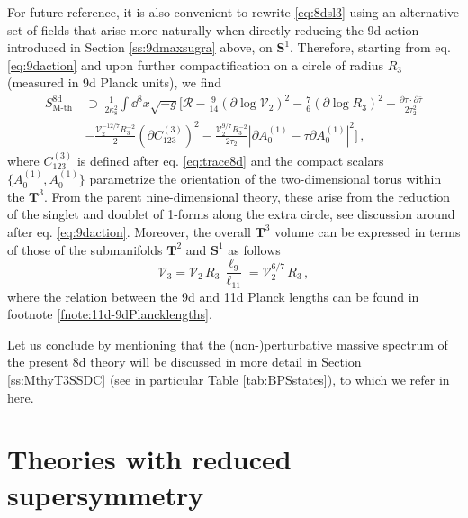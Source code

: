 For future reference, it is also convenient to rewrite \eqref{eq:8dsl3} using an alternative set of fields that arise more naturally when directly reducing the 9d action introduced in Section \ref{ss:9dmaxsugra} above, on $\mathbf{S}^1$. Therefore, starting from eq. \eqref{eq:9daction} and upon further compactification on a circle of radius $R_3$ (measured in 9d Planck units), we find
%
\begin{equation}\label{eq:8dalternativeaction}
\begin{aligned}
	S_\text{M-th}^{\text{8d}}\, &\supset\, \frac{1}{2\kappa_{8}^2} \int \dd^{8}x\sqrt{-g} \Bigg[\mathcal{R}-\frac{9}{14} \left( \partial \log \mathcal{V}_2\right)^2 - \frac{7}{6} \left( \partial \log R_3\right)^2 -\frac{\partial \tau \cdot \partial \bar \tau}{2 \tau_2^2}\\
      &- \frac{\mathcal{V}_2^{-12/7} R_3^{-2}}{2} \left( \partial C_{123}^{(3)}\right)^2 -\frac{\mathcal{V}_2^{9/7} R_3^{-2}}{2 \tau_2} \left| \partial A^{(1)}_0-\tau \partial A^{(1)}_0 \right|^2\Bigg]\, ,
\end{aligned}
\end{equation}
%
where $C_{123}^{(3)}$ is defined after eq. \eqref{eq:trace8d} and the compact scalars $\{ A^{(1)}_0, A^{(1)}_0 \}$ parametrize the orientation of the two-dimensional torus within the $\mathbf{T}^3$. From the parent nine-dimensional theory, these arise from the reduction of the singlet and doublet of 1-forms along the extra circle, see discussion around after eq. \eqref{eq:9daction}. Moreover, the overall $\mathbf{T}^3$ volume can be expressed in terms of those of the submanifolds $\mathbf{T}^2$ and $\mathbf{S}^1$ as follows
%
\begin{equation} \label{eq:T3volume}
     \mathcal{V}_3 = \mathcal{V}_2\, R_3\, \frac{\ell_9}{\ell_{11}} = \mathcal{V}_2^{6/7}\, R_3\, ,
\end{equation}
%
where the relation between the 9d and 11d Planck lengths can be found in footnote \ref{fnote:11d-9dPlancklengths}.

Let us conclude by mentioning that the (non-)perturbative massive spectrum of the present 8d theory will be discussed in more detail in Section \ref{ss:MthyT3SSDC} (see in particular Table \ref{tab:BPSstates}), to which we refer in here.

\section{Theories with reduced supersymmetry}\label{s:CYcompact}


